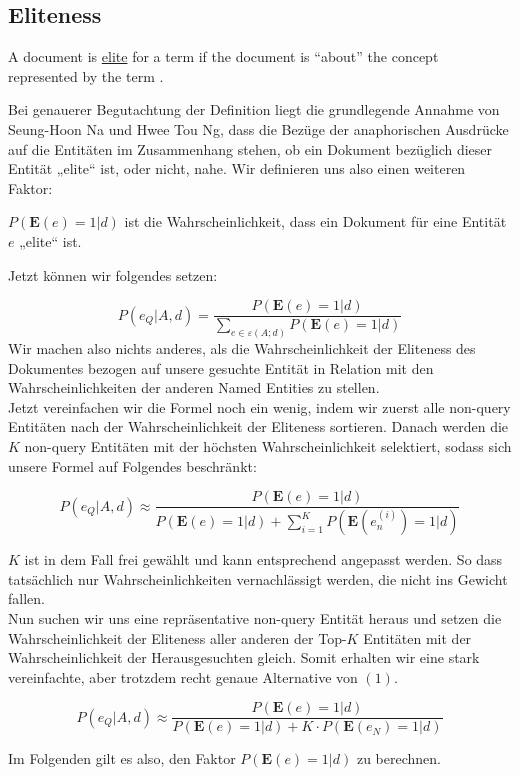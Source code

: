 \subsection{Eliteness}

\begin{defi}
	A document is \underline{elite} for a term if the document is ``about'' the concept represented by the term \cite{paper:Robertson}.
\end{defi}


Bei genauerer Begutachtung der Definition liegt die grundlegende Annahme von Seung-Hoon Na und Hwee Tou Ng, dass die Bezüge der anaphorischen Ausdrücke auf die Entitäten im Zusammenhang stehen, ob ein Dokument bezüglich dieser Entität „elite“ ist, oder nicht, nahe. Wir definieren uns also einen weiteren Faktor:

\begin{defi}
$P(\textbf{E}(e) = 1 | d)$ ist die Wahrscheinlichkeit, dass ein Dokument für eine Entität $e$ „elite“ ist.
\end{defi}

Jetzt können wir folgendes setzen:

\begin{equation}
P(e_Q | A,d) = \frac{P(\textbf{E}(e) = 1 | d)}{\sum_{e \in \varepsilon (A;d)} P(\textbf{E}(e) = 1 | d)}
\end{equation}
Wir machen also nichts anderes, als die Wahrscheinlichkeit der Eliteness des Dokumentes bezogen auf unsere gesuchte Entität in Relation mit den Wahrscheinlichkeiten der anderen Named Entities zu stellen.\\
Jetzt vereinfachen wir die Formel noch ein wenig, indem wir zuerst alle non-query Entitäten nach der Wahrscheinlichkeit der Eliteness sortieren. Danach werden die $K$ non-query Entitäten mit der höchsten Wahrscheinlichkeit selektiert, sodass sich unsere Formel auf Folgendes beschränkt:

\[ P(e_Q | A,d) \approx \frac{P(\textbf{E}(e) = 1 | d)}{P(\textbf{E}(e) = 1 | d) + \sum_{i=1}^{K} P(\textbf{E}(e_{n}^{(i)}) = 1 | d)} \]

$K$ ist in dem Fall frei gewählt und kann entsprechend angepasst werden. So dass tatsächlich nur Wahrscheinlichkeiten vernachlässigt werden, die nicht ins Gewicht fallen.\\
Nun suchen wir uns eine repräsentative non-query Entität heraus und setzen die Wahrscheinlichkeit der Eliteness aller anderen der Top-$K$ Entitäten mit der Wahrscheinlichkeit der Herausgesuchten gleich. Somit erhalten wir eine stark vereinfachte, aber trotzdem recht genaue Alternative von $(1)$.

\[ P(e_Q | A,d) \approx \frac{P(\textbf{E}(e) = 1 | d)}{P(\textbf{E}(e) = 1 | d) + K \cdot P(\textbf{E}(e_N) = 1 | d)} \]


Im Folgenden gilt es also, den Faktor $P(\textbf{E}(e) = 1 | d)$ zu berechnen.

